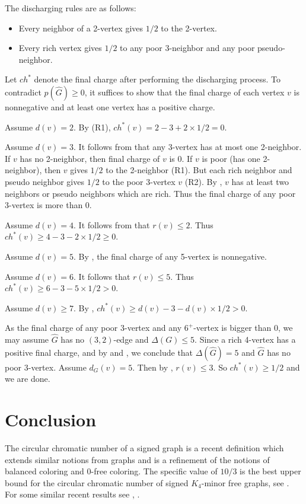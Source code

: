 \documentclass[11pt,a4paper]{article}
\theoremstyle{definition}
\begin{document}
The discharging rules are as follows:
\begin{itemize}
	\item[(\bf{R1})] Every neighbor of a 2-vertex gives  $1/2$ to the 2-vertex.
	\item[(\bf{R2})] Every rich vertex gives $1/2$ to any poor 3-neighbor and  any poor pseudo-neighbor.
\end{itemize}

Let $ch^*$ denote the final charge after performing the discharging process. To contradict $p(\widehat{G})\ge 0$, it suffices to show that the final charge of each vertex $v$ is nonnegative and at least one vertex has a positive charge.

Assume $d(v)=2$. By (R1), $ch^*(v)=2-3+2\times1/2=0$.

Assume $d(v)=3$. It follows from  that any $3$-vertex has at most one 2-neighbor. If $v$ has no 2-neighbor, then final charge of $v$ is 0. If $v$ is poor (has one 2-neighbor), then $v$ gives $1/2$ to the 2-neighbor (R1). But each rich neighbor and pseudo neighbor gives $1/2$ to the poor 3-vertex $v$ (R2). By , $v$ has at least two neighbors or pseudo neighbors which are rich. Thus the final charge of any poor 3-vertex is more than 0. 

Assume $d(v)=4$. It follows from  that $r(v)\leq 2$. Thus $ch^*(v)\ge 4-3-2\times 1/2\ge 0$. 

Assume $d(v)= 5$. By , the final charge of any  5-vertex is nonnegative. 

Assume $d(v)= 6$. It follows  that  $r(v)\leq 5$. Thus $ch^*(v)\ge 6-3-5\times 1/2> 0$. 

Assume $d(v)\ge 7$. By , $ch^*(v)\ge d(v)-3-d(v)\times 1/2> 0$.  

As the final charge of any poor $3$-vertex and any $6^+$-vertex is bigger than 0, we may assume $\widehat{G}$ has no $(3,2)$-edge and $\Delta(G)\leq 5$. Since a rich 4-vertex has a positive final charge, and by  and , we conclude that $\Delta(\widehat{G})= 5$ and $\widehat{G}$ has no poor $3$-vertex. Assume $d_G(v)=5$. 
Then by , $r(v)\leq 3$. So $ch^*(v)\ge 1/2$ and we are done.  


\section{Conclusion}
The circular chromatic number of a signed graph is a recent definition which extends similar notions from graphs and is a refinement of the notions of balanced coloring and $0$-free coloring. The specific value of $10/3$ is the best upper bound for the circular chromatic number of signed $K_{4}$-minor free graphs, see \cite{PZ22}. For some similar recent results see \cite{KNNW23}, \cite{ZZ23}.
\end{document}
